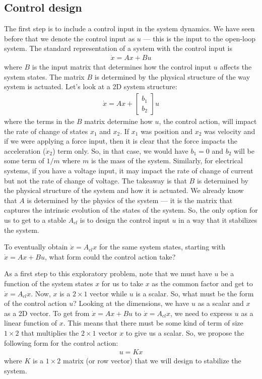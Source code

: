 \documentclass{ee122_notes}
\begin{document}
\subsection{Control design}
The first step is to include a control input in the system dynamics. We have seen before that we denote the control input as $u$ --- this is the input to the open-loop system. The standard representation of a system with the control input is 
\begin{align*}
\dot{x} = Ax + Bu
\end{align*}
where $B$ is the input matrix that determines how the control input $u$ affects the system states. The matrix $B$ is determined by the physical structure of the way system is actuated. Let's look at a 2D system structure:
\begin{align*}
\dot{x} = Ax + \begin{bmatrix} b_1 \\ b_2 \end{bmatrix}u
\end{align*} 
where the terms in the $B$ matrix determine how $u$, the control action, will impact the rate of change of states $x_1$ and $x_2$. If $x_1$ was position and $x_2$ was velocity and if we were applying a force input, then it is clear that the force impacts the acceleration ($\dot x_2$) term only. So, in that case, we would have $b_1 = 0$ and $b_2$ will be some term of $1/m$ where $m$ is the mass of the system. Similarly, for electrical systems, if you have a voltage input, it may impact the rate of change of current but not the rate of change of voltage. The takeaway is that $B$ is determined by the physical structure of the system and how it is actuated. We already know that $A$ is determined by the physics of the system --- it is the matrix that captures the intrinsic evolution of the states of the system. So, the only option for us to get to a stable $A_{cl}$ is to design the control input $u$ in a way that it stabilizes the system. 
\begin{popquiz}
To eventually obtain $\dot x = A_{cl}x$ for the same system states, starting with $\dot{x} = Ax + Bu$, what form could the control action take? 

As a first step to this exploratory problem, note that we must have $u$ be a function of the system states $x$ for us to take $x$ as the common factor and get to $\dot x = A_{cl}x$. Now, $x$ is a $2\times 1$ vector while $u$ is a scalar. So, what must be the form of the control action $u$?
\popqsplit
Looking at the dimensions, we have $u$ as a scalar and $x$ as a 2D vector. To get from $\dot{x} = Ax + Bu$ to $\dot x = A_{cl}x$, we need to express $u$ as a linear function of $x$. This means that there must be some kind of term of size $1 \times 2$ that multiplies the $2 \times 1$ vector $x$ to give us a scalar. So, we propose the following form for the control action:
\begin{align*}
u = Kx
\end{align*}
where $K$ is a $1 \times 2$ matrix (or row vector) that we will design to stabilize the system.
\end{popquiz}
\end{document}
